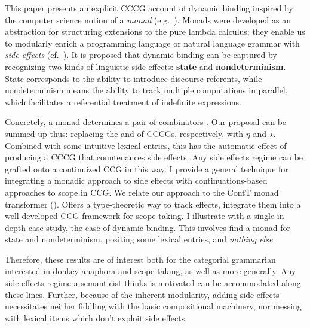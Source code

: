 	
	This paper presents an explicit CCCG account of dynamic binding inspired by the computer science notion of a \emph{monad} (e.g.~\citealt{Moggi:1989, Wadler:1992, Wadler:1994, Wadler:1995, Shan:2002}). Monads were developed as an abstraction for structuring extensions to the pure lambda calculus; they enable us to modularly enrich a programming language or natural language grammar with \emph{side effects} (cf.~\citealt{Shan:2005}). It is proposed that dynamic binding can be captured by recognizing two kinds of linguistic side effects: \textbf{state} and \textbf{nondeterminism}. State corresponds to the ability to introduce discourse referents, while nondeterminism means the ability to track multiple computations in parallel, which facilitates a referential treatment of indefinite expressions. %
	
	Concretely, a monad determines a pair of combinators \ab{\eta,\,\star}. Our proposal can be summed up thus: replacing the  and  of CCCGs, respectively, with $\eta$ and $\star$. Combined with some intuitive lexical entries, this has the automatic effect of producing a CCCG that countenances side effects. Any side effects regime can be grafted onto a continuized CCG in this way. I provide a general technique for integrating a monadic approach to side effects with continuations-based approaches to scope in CCG. We relate our approach to the ContT monad transformer (\citealt{Liangetal}). Offers a type-theoretic way to track effects, integrate them into a well-developed CCG framework for scope-taking. I illustrate with a single in-depth case study, the case of dynamic binding. This involves find a monad for state and nondeterminism, positing some lexical entries, and \emph{nothing else}.%
	
	Therefore, these results are of interest both for the categorial grammarian interested in donkey anaphora and scope-taking, as well as more generally. Any side-effects regime a semanticist thinks is motivated can be accommodated along these lines. Further, because of the inherent modularity, adding side effects necessitates neither fiddling with the basic compositional machinery, nor messing with lexical items which don't exploit side effects.%
	
